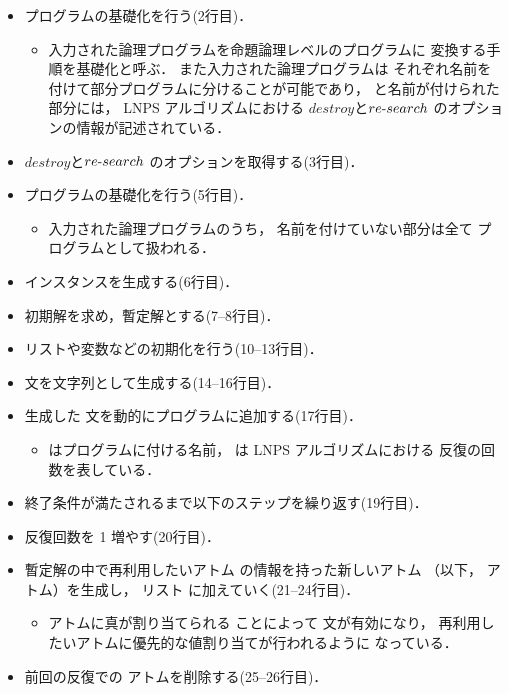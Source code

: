 \begin{itemize}
\item {} プログラムの基礎化を行う(2行目)．
 \begin{itemize}
  \item 入力された論理プログラムを命題論理レベルのプログラムに
  変換する手順を基礎化と呼ぶ．
  また入力された論理プログラムは
  それぞれ名前を付けて部分プログラムに分けることが可能であり，
   と名前が付けられた部分には，
  LNPS アルゴリズムにおける
  $destroy$と$re\mathchar`-search$ のオプションの情報が記述されている．
 \end{itemize}
\item $destroy$と$re\mathchar`-search$ のオプションを取得する(3行目)．
\item {} プログラムの基礎化を行う(5行目)．
 \begin{itemize}
  \item 入力された論理プログラムのうち，
  名前を付けていない部分は全て
   プログラムとして扱われる．
 \end{itemize}
\item インスタンスを生成する(6行目)．
\item 初期解を求め，暫定解とする(7--8行目)．
\item リストや変数などの初期化を行う(10--13行目)．
\item {}文を文字列として生成する(14--16行目)．
\item 生成した 文を動的にプログラムに追加する(17行目)．
 \begin{itemize}
  \item {} はプログラムに付ける名前，
   は LNPS アルゴリズムにおける
  反復の回数を表している．
 \end{itemize}
\item 終了条件が満たされるまで以下のステップを繰り返す(19行目)．
\item 反復回数を 1 増やす(20行目)．
\item 暫定解の中で再利用したいアトム
の情報を持った新しいアトム
（以下， アトム）を生成し，
リスト  に加えていく(21--24行目)．
 \begin{itemize}
  \item {} アトムに真が割り当てられる
  ことによって 文が有効になり，
  再利用したいアトムに優先的な値割り当てが行われるように
  なっている．
 \end{itemize}
\item 前回の反復での  アトムを削除する(25--26行目)．

\end{itemize}
